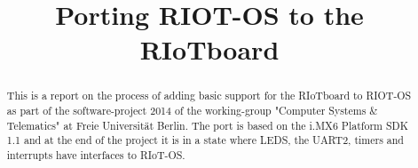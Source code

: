 \documentclass[conference,a4paper]{IEEEtran}
\begin{document}
\title{Porting RIOT-OS to the RIoTboard}

\author{
}

\maketitle

\begin{abstract}
This is a report on the process of adding basic support for the RIoTboard to RIOT-OS as
part of the software-project 2014 of the working-group "Computer Systems \& Telematics"
at Freie Universität Berlin.
The port is based on the i.MX6 Platform SDK 1.1 and at the end of the project it is in a
state where LEDS, the UART2, timers and interrupts have interfaces to RIoT-OS.
\end{abstract}

\IEEEpeerreviewmaketitle








%
%
\end{document}
